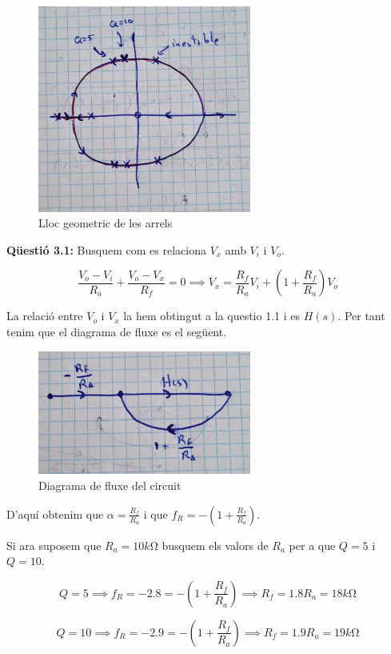 \documentclass[12pt, a4papre]{article}
\begin{document}
	\begin{figure}[H]
		\begin{center}
		\includegraphics[width=70mm]{img_p_3_2.jpeg}
		\caption{Lloc geometric de les arrels}
		\end{center}
	\end{figure}
	
	\textbf{Qüestió 3.1:} Busquem com es relaciona $V_x$ amb $V_i$ i $V_o$.
	
	\[
		\frac{V_o-V_i}{R_a} +\frac{V_o-V_x}{R_f} = 0 \implies V_x = \frac{R_f}{R_a}V_i +(1+\frac{R_f}{R_a})V_{o}
	\]
	
	La relació entre $V_o$ i $V_x$ la hem obtingut a la questio 1.1 i es $H(s)$. Per tant tenim que el diagrama de fluxe es el següent.
	
	\begin{figure}[H]
		\begin{center}
		\includegraphics[width=70mm]{img_p_3_3.jpeg}
		\caption{Diagrama de fluxe del circuit}
		\end{center}
	\end{figure}
	
	D'aquí obtenim que $\alpha = \frac{R_f}{R_a}$ i que $f_R = -(1+\frac{R_f}{R_a})$.
	
	Si ara suposem que $R_a = 10k\si{\ohm}$ busquem els valors de $R_a$ per a que $Q = 5$ i $Q = 10$.
	
	\[
		Q = 5 \implies f_R = -2.8 = -(1+\frac{R_f}{R_a}) \implies R_f = 1.8R_a = 18k\si{\ohm}
	\]
	
	\[
		Q = 10 \implies f_R = -2.9 = -(1+\frac{R_f}{R_a}) \implies R_f = 1.9R_a = 19k\si{\ohm}
	\]
	
\end{document}
